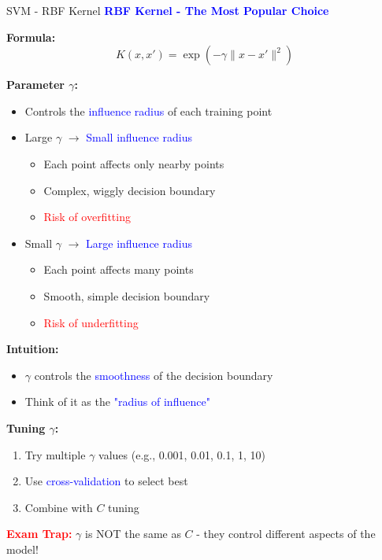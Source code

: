 \documentclass[8pt]{beamer}
\begin{document}
	\begin{frame}{SVM - RBF Kernel}
		\fontsize{6.5}{7.5}\selectfont
		\textcolor{blue}{\textbf{RBF Kernel - The Most Popular Choice}}
		
		\textbf{Formula:}
		\[
		K(x, x') = \exp(-\gamma \|x - x'\|^2)
		\]
		
		\textbf{Parameter $\gamma$:}
		\begin{itemize}
			\item Controls the \textcolor{blue}{influence radius} of each training point
			\item Large $\gamma$ $\rightarrow$ \textcolor{blue}{Small influence radius}
			\begin{itemize}
				\item Each point affects only nearby points
				\item Complex, wiggly decision boundary
				\item \textcolor{red}{Risk of overfitting}
			\end{itemize}
			\item Small $\gamma$ $\rightarrow$ \textcolor{blue}{Large influence radius}
			\begin{itemize}
				\item Each point affects many points
				\item Smooth, simple decision boundary
				\item \textcolor{red}{Risk of underfitting}
			\end{itemize}
		\end{itemize}
		
		\textbf{Intuition:}
		\begin{itemize}
			\item $\gamma$ controls the \textcolor{blue}{smoothness} of the decision boundary
			\item Think of it as the \textcolor{blue}{"radius of influence"}
		\end{itemize}
		
		\textbf{Tuning $\gamma$:}
		\begin{enumerate}
			\item Try multiple $\gamma$ values (e.g., 0.001, 0.01, 0.1, 1, 10)
			\item Use \textcolor{blue}{cross-validation} to select best
			\item Combine with $C$ tuning
		\end{enumerate}
		
		\textcolor{red}{\textbf{Exam Trap:}} $\gamma$ is NOT the same as $C$ - they control different aspects of the model!
	\end{frame}
	
\end{document}
